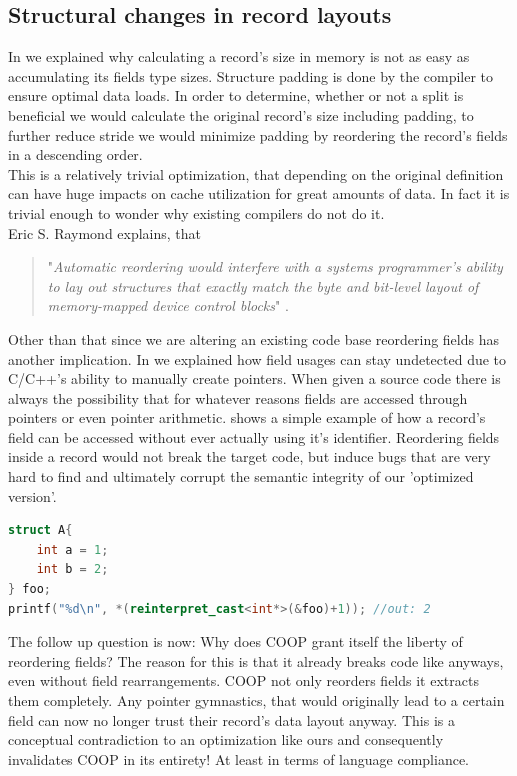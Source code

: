 \subsection{Structural changes in record layouts}\label{scirl}
In  we explained why calculating a record's size in memory is not as easy as accumulating its fields type sizes. Structure padding is done by the compiler to ensure optimal data loads. In order to determine, whether or not a split is beneficial we would calculate the original record's size including padding, to further reduce stride we would minimize padding by reordering the record's fields in a descending order.\\
This is a relatively trivial optimization, that depending on the original definition can have huge impacts on cache utilization for great amounts of data. In fact it is trivial enough to wonder why existing compilers do not do it.\\
Eric S. Raymond explains, that
\begin{quote}
	"\textit{Automatic reordering would interfere with a systems programmer’s ability to lay out structures that exactly match the byte and bit-level layout of memory-mapped device control blocks}" .
\end{quote}
Other than that since we are altering an existing code base reordering fields has another implication. In  we explained how field usages can stay undetected due to C/C++'s ability to manually create pointers. When given a source code there is always the possibility that for whatever reasons fields are accessed through pointers or even pointer arithmetic.  shows a simple example of how a record's field can be accessed without ever actually using it's identifier. Reordering fields inside a record would not break the target code, but induce bugs that are very hard to find and ultimately corrupt the semantic integrity of our 'optimized version'.
\newpage
\begin{lstlisting}[language=C++, name={Simple example of why automated field rearrangements can not be considered legal.}, label={pointer_arithmetic_access}]
struct A{
	int a = 1;
	int b = 2;
} foo;
printf("%d\n", *(reinterpret_cast<int*>(&foo)+1)); //out: 2
\end{lstlisting}
The follow up question is now: Why does COOP grant itself the liberty of reordering fields? The reason for this is that it already breaks code like  anyways, even without field rearrangements. COOP not only reorders fields it extracts them completely. Any pointer gymnastics, that would originally lead to a certain field can now no longer trust their record's data layout anyway. This is a conceptual contradiction to an optimization like ours and consequently invalidates COOP in its entirety! At least in terms of language compliance.\\\\
